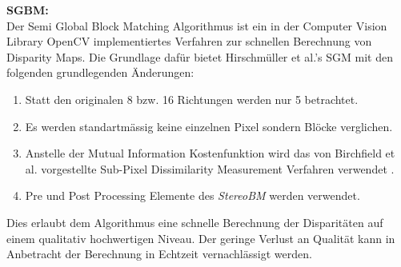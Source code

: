 \noindent
\textbf{SGBM:} \\
Der Semi Global Block Matching Algorithmus ist ein in der Computer Vision Library OpenCV implementiertes Verfahren zur schnellen Berechnung von Disparity Maps. Die Grundlage dafür bietet Hirschmüller et al.’s SGM \cite{hirschmueller2008sgm} mit den folgenden grundlegenden Änderungen:

\begin{enumerate}[label=C.\arabic*]
	\item Statt den originalen 8 bzw. 16 Richtungen werden nur 5 betrachtet. \label{item:differences_directions}
	\item Es werden  standartm\"assig keine einzelnen Pixel sondern Blöcke verglichen. \label{item:differences_matching}
	\item Anstelle der Mutual Information Kostenfunktion wird das von Birchfield et al. vorgestellte Sub-Pixel Dissimilarity Measurement Verfahren verwendet \cite{birchfield-tomasi}.
	\item Pre und Post Processing Elemente des \emph{StereoBM} \cite{opencv_doc} werden verwendet.
\end{enumerate}

\noindent
Dies erlaubt dem Algorithmus eine schnelle Berechnung der Disparitäten auf einem qualitativ hochwertigen Niveau. Der geringe Verlust an Qualität kann in Anbetracht der Berechnung in Echtzeit vernachlässigt werden.

